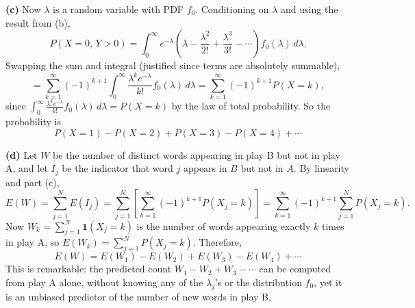 \documentclass{article}
\begin{document}
\textbf{(c)} Now $\lambda$ is a random variable with PDF $f_0$. Conditioning on $\lambda$ and using the result from (b),
$$
P(X=0,\,Y>0) = \int_0^\infty e^{-\lambda}\!\left(\lambda-\frac{\lambda^2}{2!}+\frac{\lambda^3}{3!}-\cdots\right)f_0(\lambda)\,d\lambda.
$$
Swapping the sum and integral (justified since terms are absolutely summable),
$$
= \sum_{k=1}^{\infty}(-1)^{k+1}\int_0^\infty \frac{\lambda^k e^{-\lambda}}{k!}f_0(\lambda)\,d\lambda = \sum_{k=1}^{\infty}(-1)^{k+1}P(X=k),
$$
since $\int_0^\infty \frac{\lambda^k e^{-\lambda}}{k!}f_0(\lambda)\,d\lambda = P(X=k)$ by the law of total probability. So the probability is
$$
P(X=1)-P(X=2)+P(X=3)-P(X=4)+\cdots
$$

\textbf{(d)} Let $W$ be the number of distinct words appearing in play B but not in play A, and let $I_j$ be the indicator that word $j$ appears in $B$ but not in $A$. By linearity and part (c),
$$
E(W) = \sum_{j=1}^N E(I_j) = \sum_{j=1}^N\left[\sum_{k=1}^\infty(-1)^{k+1}P(X_j=k)\right] = \sum_{k=1}^\infty(-1)^{k+1}\sum_{j=1}^N P(X_j=k).
$$
Now $W_k = \sum_{j=1}^N \mathbf{1}(X_j=k)$ is the number of words appearing exactly $k$ times in play A, so $E(W_k)=\sum_{j=1}^N P(X_j=k)$. Therefore,
$$
E(W) = E(W_1)-E(W_2)+E(W_3)-E(W_4)+\cdots
$$
This is remarkable: the predicted count $W_1-W_2+W_3-\cdots$ can be computed from play A alone, without knowing any of the $\lambda_j$'s or the distribution $f_0$, yet it is an unbiased predictor of the number of new words in play B.
\end{document}
